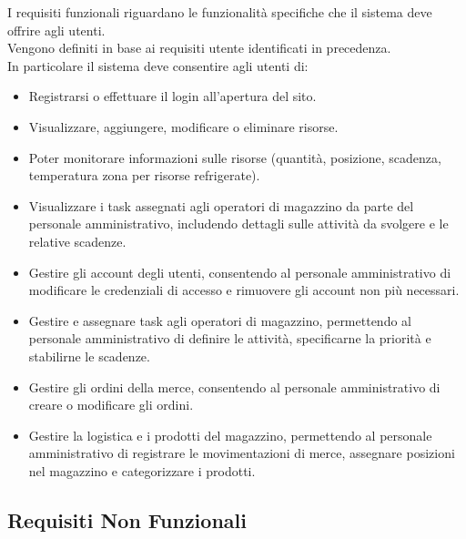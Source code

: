 I requisiti funzionali riguardano le funzionalità specifiche che il sistema
deve offrire agli utenti.\\ Vengono definiti in base ai requisiti utente identificati in precedenza.\\
In particolare il sistema deve consentire agli utenti di:
\begin{itemize}
    \item Registrarsi o effettuare il login all’apertura del sito.
    \item Visualizzare, aggiungere, modificare o eliminare risorse.
    \item Poter monitorare informazioni sulle risorse (quantità, posizione, scadenza, temperatura zona per risorse refrigerate).
    \item Visualizzare i task assegnati agli operatori di magazzino da parte del personale amministrativo, includendo dettagli sulle attività da svolgere e le relative scadenze.
    \item Gestire gli account degli utenti, consentendo al personale amministrativo di modificare le credenziali di accesso e rimuovere gli account non più necessari.
    \item Gestire e assegnare task agli operatori di magazzino, permettendo al personale amministrativo di definire le attività, specificarne la priorità e stabilirne le scadenze.
    \item Gestire gli ordini della merce, consentendo al personale amministrativo di creare o modificare gli ordini.
    \item Gestire la logistica e i prodotti del magazzino, permettendo al personale amministrativo di registrare le movimentazioni di merce, assegnare posizioni nel magazzino e categorizzare i prodotti.
\end{itemize}

\subsection{Requisiti Non Funzionali}

